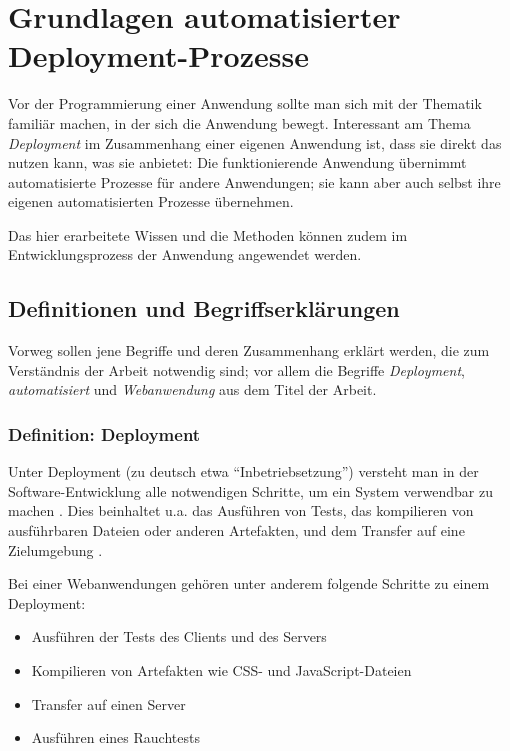 \chapter{Grundlagen automatisierter Deployment-Prozesse}

Vor der Programmierung einer Anwendung sollte man sich mit der Thematik familiär machen, in der sich die Anwendung bewegt. Interessant am Thema \emph{Deployment} im Zusammenhang einer eigenen Anwendung ist, dass sie direkt das nutzen kann, was sie anbietet: Die funktionierende Anwendung übernimmt automatisierte Prozesse für andere Anwendungen; sie kann aber auch selbst ihre eigenen automatisierten Prozesse übernehmen.

Das hier erarbeitete Wissen und die Methoden können zudem im Entwicklungsprozess der Anwendung angewendet werden.

\section{Definitionen und Begriffserklärungen}

Vorweg sollen jene Begriffe und deren Zusammenhang erklärt werden, die zum Verständnis der Arbeit notwendig sind; vor allem die Begriffe \emph{Deployment}, \emph{automatisiert} und \emph{Webanwendung} aus dem Titel der Arbeit.

\subsection{Definition: Deployment}

Unter Deployment (zu deutsch etwa ``Inbetriebsetzung'') versteht man in der Soft\-ware-Entwicklung alle notwendigen Schritte, um ein System verwendbar zu machen \citep[21]{Breuer2009}. Dies beinhaltet u.a. das Ausführen von Tests, das kompilieren von ausführbaren Dateien oder anderen Artefakten, und dem Transfer auf eine Zielumgebung \citep[4]{Humble2010}.

Bei einer Webanwendungen gehören unter anderem folgende Schritte zu einem Deployment:

\begin{itemize}
  \item Ausführen der Tests des Clients und des Servers
  \item Kompilieren von Artefakten wie CSS- und JavaScript-Dateien
  \item Transfer auf einen Server
  \item Ausführen eines Rauchtests
\end{itemize}

